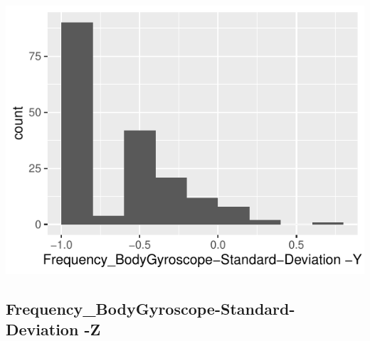 \documentclass[
]{article}
\begin{document}
\begin{minipage}{0.25 \textwidth}

\includegraphics{codebook_tidydatasub_files/figure-latex/Var-65-Frequency-BodyGyroscope-Standard-Deviation--Y-1.pdf}

\end{minipage}

\noindent\makebox[\linewidth]{\rule{\textwidth}{0.4pt}}

\hypertarget{frequency_bodygyroscope-standard-deviation--z}{%
\subsection{Frequency\_BodyGyroscope-Standard-Deviation
-Z}\label{frequency_bodygyroscope-standard-deviation--z}}
\end{document}
